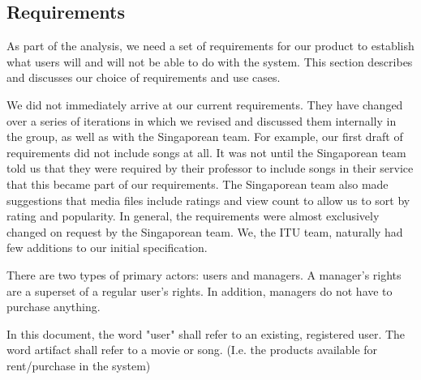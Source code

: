 \subsection{Requirements}
As part of the analysis, we need a set of requirements for our product to
establish what users will and will not be able to do with the system. This
section describes and discusses our choice of requirements and use cases.

We did not immediately arrive at our current requirements. They have changed
over a series of iterations in which we revised and discussed them internally in
the group, as well as with the Singaporean team. For example, our first draft of
requirements did not include songs at all. It was not until the Singaporean team
told us that they were required by their professor to include songs in their
service that this became part of our requirements. The Singaporean team also
made suggestions that media files include ratings and view count to allow us to
sort by rating and popularity. In general, the requirements were almost
exclusively changed on request by the Singaporean team. We, the ITU team,
naturally had few additions to our initial specification.

There are two types of primary actors: users and managers. A manager’s rights are a
superset of a regular user’s rights. In addition, managers do not have to
purchase anything.

\label{sec:requirements}
In this document, the word "user" shall refer to an existing, registered user.
The word artifact shall refer to a movie or song. (I.e. the products available
for rent/purchase in the system)

